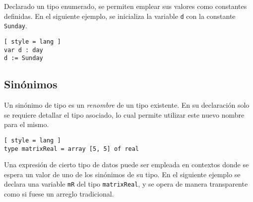 Declarado un tipo enumerado, se permiten emplear sus valores como constantes definidas.
En el siguiente ejemplo, se inicializa la variable \lstinline[style = lang]{d} con la constante \lstinline[style = lang]{Sunday}.

\begin{lstlisting}[ style = lang ]
var d : day
d := Sunday
\end{lstlisting}

\subsection{Sinónimos}

\iffalse
A type synonym is a new name for an existing type. Values of different synonyms of the same type are entirely compatible. In Haskell you can define a type synonym using type: 
Previously, we mentioned that when writing types, the [Char] and String types are equivalent and interchangeable. That's implemented with type synonyms. Type synonyms don't really do anything per se, they're just about giving some types different names so that they make more sense to someone reading our code and documentation. Here's how the standard library defines String as a synonym for [Char]
\fi

Un sinónimo de tipo es un \textit{renombre} de un tipo existente.
En su declaración solo se requiere detallar el tipo asociado, lo cual permite utilizar este nuevo nombre para el mismo.

\begin{lstlisting}[ style = lang ]
type matrixReal = array [5, 5] of real
\end{lstlisting}

Una expresión de cierto tipo de datos puede ser empleada en contextos donde se espera un valor de uno de los sinónimos de su tipo.
En el siguiente ejemplo se declara una variable \lstinline[style = lang]{mR} del tipo \lstinline[style = lang]{matrixReal}, y se opera de manera transparente como si fuese un arreglo tradicional.

